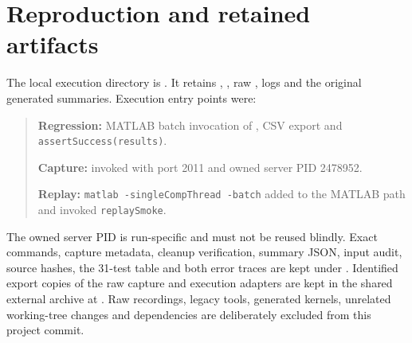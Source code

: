 \documentclass[11pt]{article}
\begin{document}
\section{Reproduction and retained artifacts}
The local execution directory is
. It retains
, , raw ,
logs and the original generated summaries. Execution entry points were:
\begin{quote}\small
\textbf{Regression:} MATLAB batch invocation of
, CSV export and
\texttt{assertSuccess(results)}.\par
\textbf{Capture:}  invoked
with port 2011 and owned server PID 2478952.\par
\textbf{Replay:} \texttt{matlab -singleCompThread -batch} added
 to the MATLAB
path and invoked \texttt{replaySmoke}.
\end{quote}
The owned server PID is run-specific and must not be reused blindly.
Exact commands, capture metadata, cleanup verification, summary JSON,
input audit, source hashes, the 31-test table and both error traces are kept
under .
Identified export copies of the raw capture and execution adapters are kept
in the shared external archive at
.
Raw recordings, legacy tools, generated kernels, unrelated working-tree
changes and dependencies are deliberately excluded from this project commit.
\end{document}
